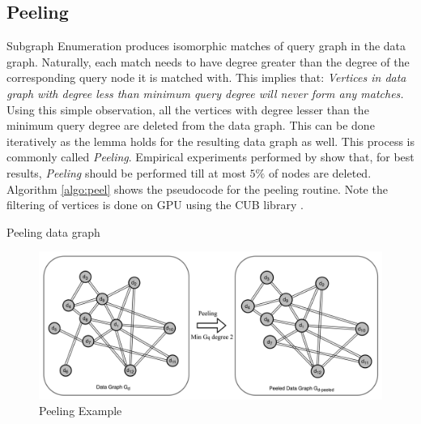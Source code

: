 \subsection{Peeling}\label{peeling}
Subgraph Enumeration produces isomorphic matches of query graph in the data graph.
Naturally, each match needs to have degree greater than the degree of the corresponding query node it is matched with.
This implies that: \textit{Vertices in data graph with degree less than minimum query degree will never form any matches.}
Using this simple observation, all the vertices with degree lesser than the minimum query degree are deleted from the data graph. This can be done iteratively as the lemma holds for the resulting data graph as well. This process is commonly called \textit{Peeling}.
Empirical experiments performed by \cite{PARSEC_VD} show that, for best results, \textit{Peeling} should be performed till at most $5\%$ of nodes are deleted.
Algorithm \ref{algo:peel} shows the pseudocode for the peeling routine.
Note the filtering of vertices is done on GPU using the CUB library \cite{cub}.
\begin{algorithm}[h]
    \caption{Peeling data graph}
    \label{algo:peel}


\end{algorithm}
\begin{figure}
    \includegraphics[width=\textwidth]{fig/LR/peeling.png}
    \caption{Peeling Example}
    \label{fig:peeling}
\end{figure}

